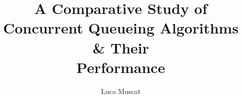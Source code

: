 \documentclass[oneside]{um-fict}  %
\title{A Comparative Study of Concurrent Queueing Algorithms \& Their\\ Performance}  %
\author{Luca Muscat}            %
\begin{document}
\frontmatter 
    \maketitle
    \if@openright\cleardoublepage\else\clearpage\fi
    \tableofcontents*\if@openright\cleardoublepage\else\clearpage\fi
    \listoffigures\if@openright\cleardoublepage\else\clearpage\fi
    \listoftables\if@openright\cleardoublepage\else\clearpage\fi
    \if@openright\cleardoublepage\else\clearpage\fi

\mainmatter 
     
    
    
    
    
    

{%
    \if@openright\cleardoublepage\else\clearpage\fi
    {\scriptsize}
	\printindex
}

\appendix
	    
\end{document}

